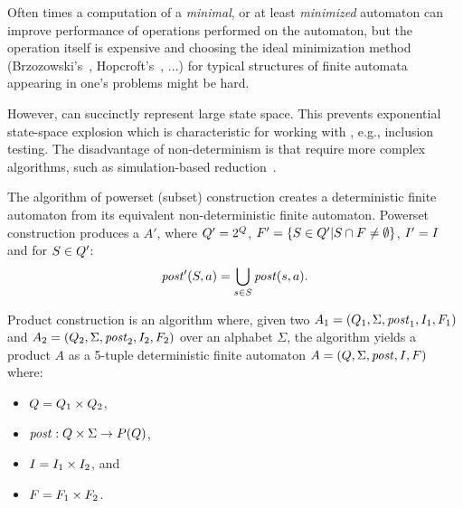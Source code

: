 Often times a computation of a \emph{minimal}, or at least \emph{minimized} automaton can improve performance of operations performed on the automaton, but the operation itself is expensive and choosing the ideal minimization method (Brzozowski's~\cite{Brzozowski1962CanonicalRE}, Hopcroft's~\cite{hopcroft_71}, $\ldots$) for typical structures of finite automata appearing in one's problems might be hard.

However, \nfas can succinctly represent large state space.
This prevents exponential state-space explosion which is characteristic for working with \dfas, e.g., inclusion testing.
The disadvantage of non-determinism is that \nfas require more complex algorithms, such as simulation-based reduction~\cite{ranzato_efficient_2010, holik_optimizing_2009, HHK95}.

\begin{definition} \hfill \newline
    The algorithm of powerset (subset) construction creates a deterministic finite automaton from its equivalent non-deterministic finite automaton. Powerset construction produces a \dfa $A'$, where $Q' = 2^Q$, $F' = \{S \in Q' | S \cap F \neq \emptyset\}$, $I' = I$ and for
    $S \in Q'$:
    $$\mathit{post}'(S, a) = \bigcup_{s \in S} \mathit{post}(s, a)\text{.}$$
\end{definition}

\begin{definition} \hfill \newline
Product construction is an algorithm where, given two \nfas $A_1 = (Q_1, \Sigma, \mathit{post}_1, I_1, F_1)$ and $A_2 = (Q_2, \Sigma, \mathit{post}_2, I_2, F_2)$ over an alphabet $\Sigma$, the algorithm yields a product \nfa $A$ as a 5-tuple deterministic finite automaton $A = (Q, \Sigma, \mathit{post}, I, F)$ where:
\begin{itemize}
    \item $Q = Q_1 \times Q_2$,
    \item $\mathit{post}: Q \times \Sigma \rightarrow{} P(Q)$,
    \item $I = I_1 \times I_2$, and
    \item $F = F_1 \times F_2$.
\end{itemize}
\end{definition}

